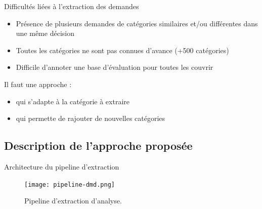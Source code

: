 \documentclass[newPxFont,pagenumber]{beamer}
\begin{document}
\begin{frame}{Difficultés liées à l'extraction des demandes}
\begin{alertblock}{}
\begin{itemize}
\item Présence de plusieurs demandes de catégories similaires et/ou différentes dans une m\^eme décision
\item Toutes les catégories ne sont pas connues d'avance (+500 catégories)
\item Difficile d'annoter une base d'évaluation pour toutes les couvrir
\end{itemize}
\end{alertblock}

\begin{block}{Il faut une approche :}
\begin{itemize}
\item qui s'adapte à la catégorie à extraire 
\item qui permette de rajouter de nouvelles catégories 
\end{itemize}
\end{block}
\end{frame}

\subsection{Description de l'approche proposée}
\begin{frame}{Architecture du pipeline d'extraction}
\begin{figure}
\texttt{[image: pipeline-dmd.png]}
\caption{Pipeline d'extraction d'analyse.}
\end{figure}
\end{frame}
\end{document}
